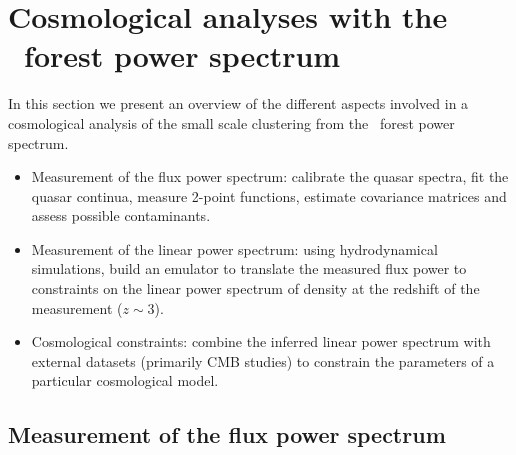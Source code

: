 \section{Cosmological analyses with the \lya\ forest power spectrum}
\label{sec:over}

In this section we present an overview of the different aspects involved in
a cosmological analysis of the small scale clustering from the \lya\ forest
power spectrum.

\begin{itemize}
 \item Measurement of the flux power spectrum: calibrate the quasar spectra,
  fit the quasar continua, measure 2-point functions, estimate covariance
  matrices and assess possible contaminants.
 \item Measurement of the linear power spectrum: using hydrodynamical
  simulations, build an emulator to translate the measured flux power to
  constraints on the linear power spectrum of density at the redshift of
  the measurement ($z \sim 3$).
 \item Cosmological constraints: combine the inferred linear power spectrum
  with external datasets (primarily CMB studies) to constrain the parameters
  of a particular cosmological model.
\end{itemize}


\subsection{Measurement of the flux power spectrum}


